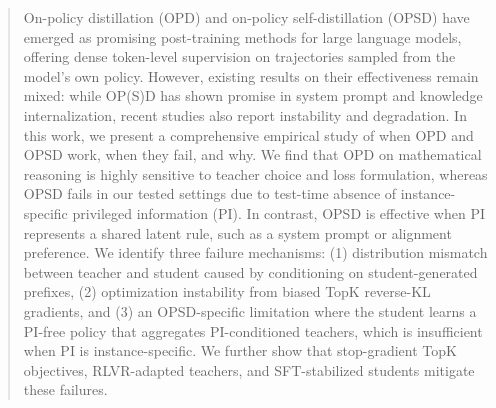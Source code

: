 \begin{abstract}

On-policy distillation (OPD) and on-policy self-distillation (OPSD) have emerged
as promising post-training methods for large language models, offering dense
token-level supervision on trajectories sampled from the model's own policy.
However, existing results on their effectiveness remain mixed: while OP(S)D has
shown promise in system prompt and knowledge internalization, recent studies also report
instability and degradation. In this work, we present a
comprehensive empirical study of when OPD and OPSD work, when they fail, and why. We find that
OPD on mathematical reasoning is highly sensitive to teacher choice and loss formulation, whereas OPSD fails in our tested settings due to test-time absence of instance-specific privileged information (PI). In contrast,
OPSD is effective when PI represents a shared latent rule,
such as a system prompt or alignment preference. We identify three failure
mechanisms: (1) distribution mismatch between teacher and student caused by conditioning on student-generated prefixes, (2) optimization
instability from biased TopK reverse-KL gradients, and (3) an
OPSD-specific limitation where the student learns a PI-free policy that aggregates PI-conditioned teachers, which
is insufficient when PI is instance-specific. We further show that stop-gradient TopK objectives, RLVR-adapted teachers, and SFT-stabilized students mitigate these failures.


\end{abstract}
